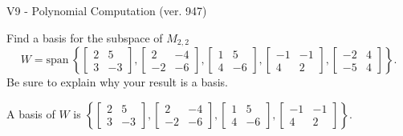 \begin{exercise}
  \begin{exerciseTitle}V9 - Polynomial Computation (ver. 947)\end{exerciseTitle}
  \begin{exerciseStatement}
    Find a basis for the subspace of \(M_{2,2}\) 
\[W=\mathrm{span}\ \left\{\left[\begin{array}{cc}
2 & 5 \\
3 & -3
\end{array}\right] , \left[\begin{array}{cc}
2 & -4 \\
-2 & -6
\end{array}\right] , \left[\begin{array}{cc}
1 & 5 \\
4 & -6
\end{array}\right] , \left[\begin{array}{cc}
-1 & -1 \\
4 & 2
\end{array}\right] , \left[\begin{array}{cc}
-2 & 4 \\
-5 & 4
\end{array}\right]\right\}.\]
 Be sure to explain why your result is a basis.


  \end{exerciseStatement}
  \begin{exerciseAnswer}
   A basis of \(W\) is  \(\left\{\left[\begin{array}{cc}
2 & 5 \\
3 & -3
\end{array}\right] , \left[\begin{array}{cc}
2 & -4 \\
-2 & -6
\end{array}\right] , \left[\begin{array}{cc}
1 & 5 \\
4 & -6
\end{array}\right] , \left[\begin{array}{cc}
-1 & -1 \\
4 & 2
\end{array}\right]\right\}\).
  


  \end{exerciseAnswer}
\end{exercise}